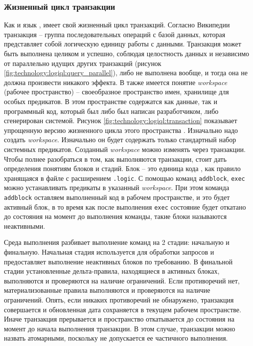 \subsubsection{Жизненный цикл транзакции}
\label{sec:technology:logiql:transaction}

Как и язык \sql, \logiql имеет свой жизненный цикл транзакций. Согласно Википедии \cite{transaction_definition} транзакция – группа последовательных операций с базой данных, которая представляет собой логическую единицу работы с данными. Транзакция может быть выполнена целиком и успешно, соблюдая целостность данных и независимо от параллельно идущих других транзакций (рисунок \ref{fig:technology:logiql:query_parallel}), либо не выполнена вообще, и тогда она не должна произвести никакого эффекта.
В \logiql также имеется понятие \emph{workspace} (рабочее пространство) – своеобразное пространство имен, хранилище для особых предикатов. В этом пространстве содержатся как данные, так и программный код, который был либо был написан разработчиком, либо сгенерирован системой. Рисунок \ref{fig:technology:logiql:transaction} показывает упрощенную версию жизненного цикла этого пространства \cite{query_language_for_smart_db}.
Изначально надо создать \emph{workspace}. Изначально он будет содержать только стандартный набор системных предикатов. Созданный \emph{workspace} можно изменять через транзакции.
Чтобы полнее разобраться в том, как выполняются транзакции, стоит дать определения понятиям блоков и стадий. Блок – это единица кода \logiql, как правило хранящаяся в файле с расширением \lstinline{.logic}. С помощью команд \lstinline{addblock}, \lstinline{exec} можно устанавливать предикаты в указанный \emph{workspace}. При этом команда \lstinline{addblock} оставляем выполненный код в рабочем пространстве, и это будет активный блок, в то время как после выполнения \lstinline{exec} состояние будет откатано до состояния на момент до выполнения команды, такие блоки называются неактивными.

Среда выполнения \logiql разбивает выполнение команд на 2 стадии: начальную и финальную. Начальная стадия используется для обработки запросов и предоставляет выполнение неактивных блоков по требованию. В финальной стадии установленные дельта-правила, находящиеся в активных блоках, выполняются и проверяются на наличие ограничений. Если противоречий нет, материализованные правила выполняются и проверяются на наличие ограничений. Опять, если никаких противоречий не обнаружено, транзакция совершается и обновленная дата сохраняется в текущем рабочем пространстве. Иначе транзакция прерывается и пространство откатывается до состояния на момент до начала выполнения транзакции. В этом случае, транзакции можно назвать атомарными, поскольку не допускается ее частичного выполнения.

